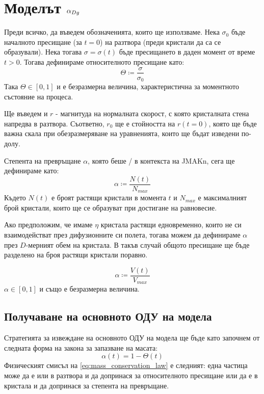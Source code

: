 \section{Моделът \texorpdfstring{$\alpha_{Dg}$}{αDg}} 
Преди всичко, да въведем обозначенията, които ще използваме. Нека $\sigma_0$ бъде началното пресищане (за $t = 0 $) на разтвора (преди кристали да са се образували). Нека тогава $\sigma = \sigma(t)$ бъде пресищането в даден момент от време $t > 0$. Тогава дефинираме относителното пресищане като:
\begin{equation*}
	\Theta \coloneqq \frac{\sigma}{\sigma_0}
\end{equation*}
Така $\Theta \in [0,1]$ и е безразмерна величина, характеристична за моментното състояние на процеса.

Ще въведем и $r$  - магнитуда на нормалната скорост, с която кристалната стена напредва в разтвора. Съответно, $r_0$ ще е стойността на $r(t=0)$, която ще бъде важна скала при обезразмеряване на уравненията, които ще бъдат изведени по-долу.

Степента на превръщане $\alpha$, която беше / в контекста на JMAKn, сега ще дефинираме като:
\begin{equation}
	\label{eq:alpha_ndef_def}
	\alpha \coloneqq \frac{N(t)}{N_{max}}
\end{equation}
Където $N(t)$ е броят растящи кристали в момента $t$ и $N_{max}$ е максималният брой кристали, които ще се образуват при достигане на равновесие.

Ако предположим, че имаме $\eta$ кристала растящи едновременно, които не си взаимодействат през дифузионните си полета, тогава можем да дефинираме $\alpha$ през $D$-мерният обем на кристала. В такъв случай общото пресищане ще бъде разделено на броя растящи кристали поравно.

\begin{equation}
	\label{eq:alpha_vol_def}
	\alpha \coloneqq \frac{V(t)}{V_{max}}
\end{equation}
$\alpha \in [0,1]$ и също е безразмерна величина.

\subsection{Получаване на основното ОДУ на модела}
Стратегията за извеждане на основното ОДУ на модела ще бъде като започнем от следната форма на закона за запазване на масата:
\begin{equation}
	\label{eq:mass_conservation_law}
	\alpha(t) = 1 - \Theta(t)
\end{equation}
\noindent Физическият смисъл на \autoref{eq:mass_conservation_law} е следният: една частица може да е или в разтвора и да допринася за относителното пресищане или да е в кристала и да допринася за степента на превръщане.

